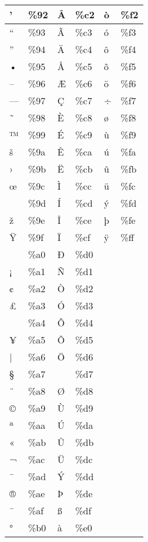 \begin{longtable}{|l|l|l|l|l|l|}
\hline
’			&\%92		&Â			&\%c2		&ò			&\%f2		\\
\hline
“			&\%93		&Ã			&\%c3		&ó			&\%f3		\\
\hline
”			&\%94		&Ä			&\%c4		&ô			&\%f4		\\
\hline
•			&\%95		&Å			&\%c5		&õ			&\%f5		\\
\hline
–			&\%96		&Æ			&\%c6		&ö			&\%f6		\\
\hline
—			&\%97		&Ç			&\%c7		&÷			&\%f7		\\
\hline
˜			&\%98		&È			&\%c8		&ø			&\%f8		\\
\hline
™			&\%99		&É			&\%c9		&ù			&\%f9		\\
\hline
š			&\%9a		&Ê			&\%ca		&ú			&\%fa		\\
\hline
›			&\%9b		&Ë			&\%cb		&û			&\%fb 		\\
\hline
œ			&\%9c		&Ì			&\%cc		&ü			&\%fc 		\\
\hline
 			&\%9d		&Í			&\%cd		&ý			&\%fd		\\
\hline
ž			&\%9e		&Î			&\%ce		&þ			&\%fe 		\\
\hline
Ÿ			&\%9f		&Ï			&\%cf		&ÿ			&\%ff		\\
\hline
 			&\%a0		&Ð			&\%d0		& 	 		&			\\
\hline
¡			&\%a1		&Ñ			&\%d1	 	 &			&			\\
\hline
¢			&\%a2		&Ò			&\%d2	 	 &			&			\\
\hline
£			&\%a3		&Ó			&\%d3	 	 &			&			\\
\hline
 			&\%a4		&Ô			&\%d4	 	 &			&			\\
\hline
¥			&\%a5		&Õ			&\%d5	 	 &			&			\\
\hline
|			&\%a6		&Ö			&\%d6	 	 &			&			\\
\hline
§			&\%a7		&			&\%d7		&	 	 	&			\\
\hline
¨			&\%a8		&Ø			&\%d8	 	 &			&			\\
\hline
©			&\%a9		&Ù			&\%d9	 	 &			&			\\
\hline
ª			&\%aa		&Ú			&\%da	 	 &			&			\\
\hline
«			&\%ab		&Û			&\%db	 	 &			&			\\
\hline
¬			&\%ac		&Ü			&\%dc	 	&			&			\\
\hline	 
¯			&\%ad		&Ý			&\%dd	 	 &			&			\\
\hline
®			&\%ae		&Þ			&\%de		&			&			\\
\hline 	 
¯			&\%af		&ß			&\%df	 	 &			&			\\
\hline
°			&\%b0		&à			&\%e0		&			&			\\

\end{longtable}
